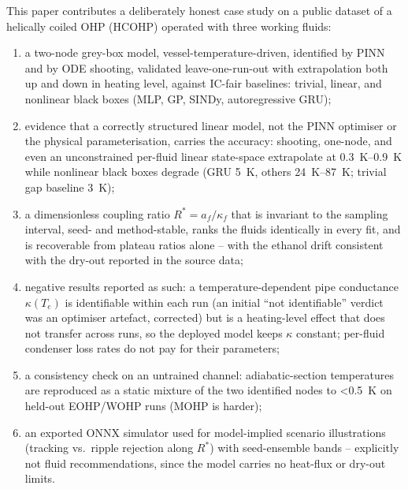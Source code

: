 This paper contributes a deliberately honest case study on a public dataset of a helically coiled OHP (HCOHP)
\cite{dataset,dib} operated with three working fluids:
\begin{enumerate}
  \item a two-node grey-box model, vessel-temperature-driven, identified by PINN and by ODE shooting, validated
        leave-one-run-out with extrapolation both up and down in heating level, against IC-fair baselines:
        trivial, linear, and nonlinear black boxes (MLP, GP, SINDy, autoregressive GRU);
  \item evidence that a correctly structured linear model, not the PINN optimiser or the physical
        parameterisation, carries the accuracy: shooting, one-node, and even an unconstrained per-fluid linear
        state-space extrapolate at \SIrange{0.3}{0.9}{\kelvin} while nonlinear black boxes degrade
        (GRU \SI{5}{\kelvin}, others \SIrange{24}{87}{\kelvin}; trivial gap baseline \SI{3}{\kelvin});
  \item a dimensionless coupling ratio $R^*=a_f/\kappa_f$ that is invariant to the sampling interval,
        seed- and method-stable, ranks the fluids identically in every fit, and is recoverable from plateau
        ratios alone -- with the ethanol drift consistent with the dry-out reported in the source data;
  \item negative results reported as such: a temperature-dependent pipe conductance $\kappa(T_e)$ is
        identifiable within each run (an initial ``not identifiable'' verdict was an optimiser artefact,
        corrected) but is a heating-level effect that does not transfer across runs, so the deployed model
        keeps $\kappa$ constant; per-fluid condenser loss rates do not pay for their parameters;
  \item a consistency check on an untrained channel: adiabatic-section temperatures are reproduced as a static
        mixture of the two identified nodes to \SI{<0.5}{\kelvin} on held-out EOHP/WOHP runs (MOHP is harder);
  \item an exported ONNX simulator used for model-implied scenario illustrations (tracking vs.\ ripple rejection
        along $R^*$) with seed-ensemble bands -- explicitly not fluid recommendations, since the model carries no
        heat-flux or dry-out limits.
\end{enumerate}
